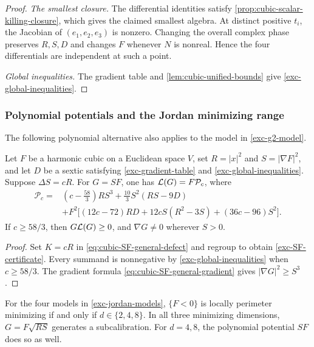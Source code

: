 \begin{proof}
\emph{The smallest closure.}
The differential identities satisfy
\cref{prop:cubic-scalar-killing-closure}, which gives the claimed
smallest algebra. At distinct positive \(t_i\), the Jacobian
of \((e_1,e_2,e_3)\) is nonzero. Changing the overall complex
phase preserves \(R,S,D\) and changes \(F\) whenever \(N\)
is nonreal. Hence the four differentials are independent at such
a point.

\emph{Global inequalities.}
The gradient table and \cref{lem:cubic-unified-bounds} give
\eqref{exc-global-inequalities}.
\end{proof}

\subsubsection{Polynomial potentials and the Jordan minimizing range}
\label{exc-multipliers}

The following polynomial alternative also applies to the model in
\cref{exc-g2-model}.

\begin{proposition}
\label{prop:exc-SF-certificate}
Let \(F\) be a harmonic cubic on a Euclidean space \(V\), set
\(R=|x|^2\) and \(S=|\nabla F|^2\), and let \(D\) be a
sextic satisfying \eqref{exc-gradient-table} and
\eqref{exc-global-inequalities}. Suppose \(\Delta S=cR\).
For \(G=SF\), one has \(\mathcal L(G)=F\mathcal P_c\), where
\begin{equation}\label{exc-SF-certificate}
\begin{aligned}
 \mathcal P_c={}&(c-\tfrac{58}{3})RS^3
       +\tfrac{10}{3}S^2(RS-9D)\\
 &+F^2\bigl[(12c-72)RD+12cS(R^2-3S)+(36c-96)S^2\bigr].
\end{aligned}
\end{equation}
If \(c\geq58/3\), then \(G\mathcal L(G)\geq0\), and
\(\nabla G\neq0\) wherever \(S>0\).
\end{proposition}

\begin{proof}
Set \(K=cR\) in \eqref{eq:cubic-SF-general-defect} and regroup
to obtain \eqref{exc-SF-certificate}. Every summand is nonnegative
by \eqref{exc-global-inequalities} when \(c\geq58/3\).
The gradient formula \eqref{eq:cubic-SF-general-gradient} gives
\(|\nabla G|^2\geq S^3\).
\end{proof}

\begin{theorem}
\label{thm:exc-jordan-minimizing}
For the four models in \cref{exc-jordan-models},
\(\{F<0\}\) is locally perimeter minimizing if and only if
\(d\in\{2,4,8\}\). In all three minimizing dimensions,
\(G=F\sqrt{RS}\) generates a subcalibration. For \(d=4,8\),
the polynomial potential \(SF\) does so as well.
\end{theorem}

